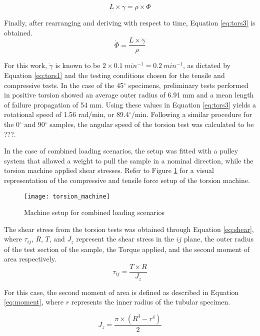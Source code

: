 \documentclass[main.tex]{subfiles}
\begin{document}
\begin{equation}\label{eq:tors2}
L\times \gamma= \rho \times \Phi  
\end{equation}

Finally, after rearranging and deriving with respect to time, Equation \ref{eq:tors3} is obtained.
\begin{equation}\label{eq:tors3}
\dot{\Phi}=\frac{L\times\dot{\gamma}}{\rho}  
\end{equation}

For this work, $\dot{\gamma}$ is known to be $2 \times 0.1~min^{-1}= 0.2~min^{-1}$, as dictated by Equation \ref{eq:tors1} and the testing conditions chosen for the tensile and compressive tests. In the case of the 45$^\circ$ specimens, preliminary tests performed in positive torsion showed an average outer radius of 6.91 mm and a mean length of failure propagation of 54 mm. Using these values in Equation \ref{eq:tors3} yields a rotational speed of 1.56 rad/min, or 89.4$^\circ$/min. Following a similar procedure for the 0$^\circ$ and 90$^\circ$ samples, the angular speed of the torsion test was calculated to be ???.%

\pagebreak
In the case of combined loading scenarios, the setup was fitted with a pulley system that allowed a weight to pull the sample in a nominal direction, while the torsion machine applied shear stresses. Refer to Figure \ref{fig:torscomb} for a visual representation of the compressive and tensile force setup of the torsion machine. 

\begin{figure}[!htbp]
	\center
	\texttt{[image: torsion\_machine]}
	\caption{Machine setup for combined loading scenarios} \label{fig:torscomb}
\end{figure}

The shear stress from the torsion tests was obtained through Equation \ref{eq:shear}, where $\tau_{ij}$, $R$, $T$, and $J_{z}$ represent the shear stress in the $ij$ plane, the outer radius of the test section of the sample, the Torque applied, and the second moment of area respectively.
\begin{equation}\label{eq:shear}
\tau_{ij}=\frac{T\times R}{J_{z}}  
\end{equation}

For this case, the second moment of area is defined as described in Equation \ref{eq:moment}, where $r$ represents the inner radius of the tubular specimen.

\begin{equation}\label{eq:moment}
J_{z}=\frac{\pi\times (R^4-r^4)}{2}  
\end{equation}
\end{document}
